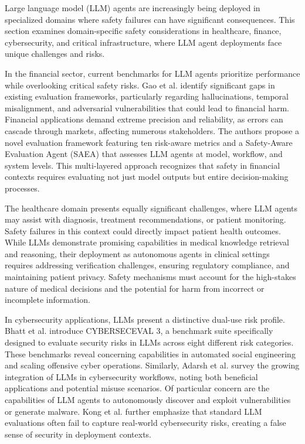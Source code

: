 \documentclass[conference]{IEEEtran}
\begin{document}
Large language model (LLM) agents are increasingly being deployed in specialized domains where safety failures can have significant consequences. This section examines domain-specific safety considerations in healthcare, finance, cybersecurity, and critical infrastructure, where LLM agent deployments face unique challenges and risks.

In the financial sector, current benchmarks for LLM agents prioritize performance while overlooking critical safety risks. Gao et al. \cite{2502.15865} identify significant gaps in existing evaluation frameworks, particularly regarding hallucinations, temporal misalignment, and adversarial vulnerabilities that could lead to financial harm. Financial applications demand extreme precision and reliability, as errors can cascade through markets, affecting numerous stakeholders. The authors propose a novel evaluation framework featuring ten risk-aware metrics and a Safety-Aware Evaluation Agent (SAEA) that assesses LLM agents at model, workflow, and system levels. This multi-layered approach recognizes that safety in financial contexts requires evaluating not just model outputs but entire decision-making processes.

The healthcare domain presents equally significant challenges, where LLM agents may assist with diagnosis, treatment recommendations, or patient monitoring. Safety failures in this context could directly impact patient health outcomes. While LLMs demonstrate promising capabilities in medical knowledge retrieval and reasoning, their deployment as autonomous agents in clinical settings requires addressing verification challenges, ensuring regulatory compliance, and maintaining patient privacy. Safety mechanisms must account for the high-stakes nature of medical decisions and the potential for harm from incorrect or incomplete information.

In cybersecurity applications, LLMs present a distinctive dual-use risk profile. Bhatt et al. \cite{2408.01605} introduce CYBERSECEVAL 3, a benchmark suite specifically designed to evaluate security risks in LLMs across eight different risk categories. These benchmarks reveal concerning capabilities in automated social engineering and scaling offensive cyber operations. Similarly, Adarsh et al. \cite{2402.16968} survey the growing integration of LLMs in cybersecurity workflows, noting both beneficial applications and potential misuse scenarios. Of particular concern are the capabilities of LLM agents to autonomously discover and exploit vulnerabilities or generate malware. Kong et al. \cite{2502.00072} further emphasize that standard LLM evaluations often fail to capture real-world cybersecurity risks, creating a false sense of security in deployment contexts.
\end{document}
